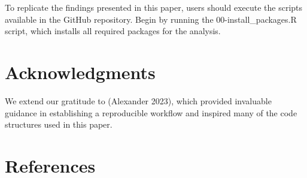 \documentclass[
  letterpaper,
  DIV=11,
  numbers=noendperiod]{scrartcl}
\begin{document}
To replicate the findings presented in this paper, users should execute
the scripts available in the GitHub repository. Begin by running the
00-install\_packages.R script, which installs all required packages for
the analysis.

\hypertarget{acknowledgments}{%
\section{Acknowledgments}\label{acknowledgments}}

We extend our gratitude to (Alexander 2023), which provided invaluable
guidance in establishing a reproducible workflow and inspired many of
the code structures used in this paper.

\newpage

\hypertarget{references}{%
\section*{References}\label{references}}
\end{document}
